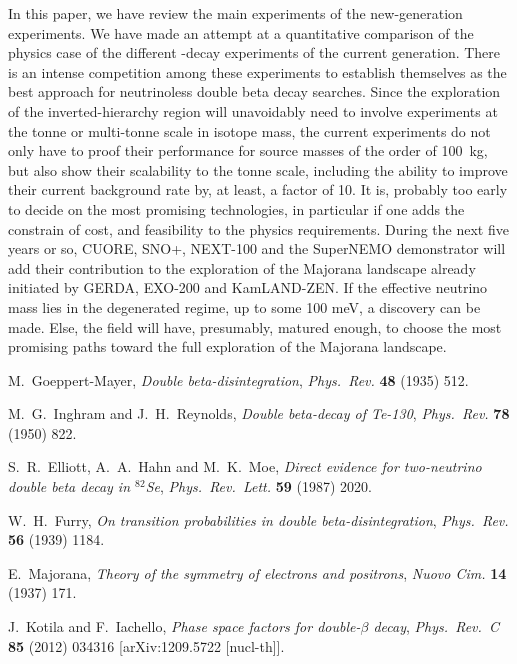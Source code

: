\documentclass{PoS}
\begin{document}
In this paper, we have review the main experiments of the new-generation experiments. We have made an attempt at a quantitative comparison of the physics case of the different \bbonu-decay experiments of the current generation. There is an intense competition among these experiments to establish themselves as the best approach for neutrinoless double beta decay searches. Since the exploration of the inverted-hierarchy region will unavoidably need to involve experiments at the tonne or multi-tonne scale in isotope mass, the current experiments do not only have to proof their performance for source masses of the order of 100~kg, but also show their scalability to the tonne scale, including the ability to improve their current background rate by, at least, a factor of 10. It is, probably too early to decide on the most promising technologies, in particular if one adds the constrain of cost, and feasibility to the physics requirements. During the next five years or so, CUORE, SNO+, NEXT-100 and the SuperNEMO demonstrator will add their contribution to the exploration of the Majorana landscape already initiated by GERDA, EXO-200 and KamLAND-ZEN. If the effective neutrino mass lies in the degenerated regime, up to some 100 meV, a discovery can be made. Else, the field will have, presumably, matured enough, to choose the most promising paths toward the full exploration of the Majorana landscape.  








\begin{thebibliography}{99}

   M.~Goeppert-Mayer,
   \emph{Double beta-disintegration},
   \emph{Phys.\ Rev.} {\bf 48} (1935) 512.

   M.~G.~Inghram and J.~H.~Reynolds,
   \emph{Double beta-decay of Te-130},
   \emph{Phys.\ Rev.} {\bf 78} (1950) 822.

   S.~R.~Elliott, A.~A.~Hahn and M.~K.~Moe,
   \emph{Direct evidence for two-neutrino double beta decay in $^{82}$Se},
   \emph{Phys.\ Rev.\ Lett.} {\bf 59} (1987) 2020.

   W.~H.~Furry,
   \emph{On transition probabilities in double beta-disintegration},
   \emph{Phys.\ Rev.} {\bf 56} (1939) 1184.

   E.~Majorana,
   \emph{Theory of the symmetry of electrons and positrons},
   \emph{Nuovo Cim.} {\bf 14} (1937) 171.

   J.~Kotila and F.~Iachello,
   \emph{Phase space factors for double-$\beta$ decay},
   \emph{Phys.\ Rev.\ C} {\bf 85} (2012) 034316
   [arXiv:1209.5722 [nucl-th]].


\end{thebibliography}
\end{document}
